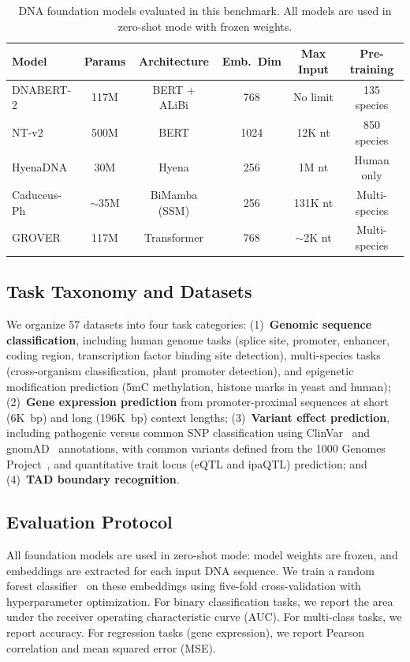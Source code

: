\documentclass{article}
\begin{document}
\begin{table}[t]
\centering
\caption{DNA foundation models evaluated in this benchmark. All models are used
in zero-shot mode with frozen weights.}
\label{tab:models}
\begin{tabular}{lccccc}
\toprule
Model & Params & Architecture & Emb.\ Dim & Max Input & Pre-training \\
\midrule
DNABERT-2 & 117M & BERT + ALiBi & 768 & No limit & 135 species \\
NT-v2 & 500M & BERT & 1024 & 12K nt & 850 species \\
HyenaDNA & 30M & Hyena & 256 & 1M nt & Human only \\
Caduceus-Ph & $\sim$35M & BiMamba (SSM) & 256 & 131K nt & Multi-species \\
GROVER & 117M & Transformer & 768 & $\sim$2K nt & Multi-species \\
\bottomrule
\end{tabular}
\end{table}

\subsection{Task Taxonomy and Datasets}

We organize 57 datasets into four task categories:
(1)~\textbf{Genomic sequence classification}, including human genome tasks
(splice site, promoter, enhancer, coding region, transcription factor binding
site detection), multi-species tasks (cross-organism classification, plant
promoter detection), and epigenetic modification prediction (5mC methylation,
histone marks in yeast and human);
(2)~\textbf{Gene expression prediction} from promoter-proximal sequences at
short (6K~bp) and long (196K~bp) context lengths;
(3)~\textbf{Variant effect prediction}, including pathogenic versus common SNP
classification using ClinVar~\citep{landrum_2018_clinvar} and
gnomAD~\citep{karczewski_2020_gnomad} annotations, with common variants defined
from the 1000 Genomes Project~\citep{auton_2015_1000genomes}, and quantitative
trait locus (eQTL and ipaQTL) prediction; and
(4)~\textbf{TAD boundary recognition}.

\subsection{Evaluation Protocol}

All foundation models are used in zero-shot mode: model weights are frozen, and
embeddings are extracted for each input DNA sequence. We train a random forest
classifier~\citep{breiman_2001_random} on these embeddings using five-fold
cross-validation with hyperparameter optimization. For binary classification
tasks, we report the area under the receiver operating characteristic curve
(AUC). For multi-class tasks, we report accuracy. For regression tasks (gene
expression), we report Pearson correlation and mean squared error (MSE).
\end{document}
